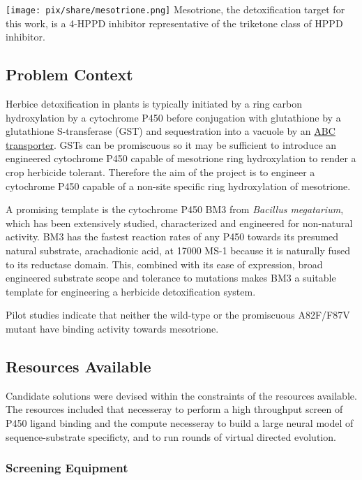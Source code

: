 \textbar\textbar\textbar{} \textbar\textbar\textbar{}
\textbar{}\texttt{[image: pix/share/mesotrione.png]}
\textbar Mesotrione, the detoxification target for this work, is a
4-HPPD inhibitor representative of the triketone class of HPPD
inhibitor.\textbar{}

\hypertarget{problem-context}{%
\subsection{Problem Context}\label{problem-context}}

Herbice detoxification in plants is typically initiated by a ring carbon
hydroxylation by a cytochrome P450 before conjugation with glutathione
by a glutathione S-transferase (GST) and sequestration into a vacuole by
an \href{really?}{ABC transporter}. GSTs can be promiscuous so it may be
sufficient to introduce an engineered cytochrome P450 capable of
mesotrione ring hydroxylation to render a crop herbicide tolerant.
Therefore the aim of the project is to engineer a cytochrome P450
capable of a non-site specific ring hydroxylation of mesotrione.

A promising template is the cytochrome P450 BM3 from \emph{Bacillus
megatarium}, which has been extensively studied, characterized and
engineered for non-natural activity. BM3 has the fastest reaction rates
of any P450 towards its presumed natural substrate, arachadionic acid,
at 17000 MS-1 because it is naturally fused to its reductase domain.
This, combined with its ease of expression, broad engineered substrate
scope and tolerance to mutations makes BM3 a suitable template for
engineering a herbicide detoxification system.

Pilot studies indicate that neither the wild-type or the promiscuous
A82F/F87V mutant have binding activity towards mesotrione.

\hypertarget{resources-available}{%
\subsection{Resources Available}\label{resources-available}}

Candidate solutions were devised within the constraints of the resources
available. The resources included that necesseray to perform a high
throughput screen of P450 ligand binding and the compute necesseray to
build a large neural model of sequence-substrate specificty, and to run
rounds of virtual directed evolution.

\hypertarget{screening-equipment}{%
\subsubsection{Screening Equipment}\label{screening-equipment}}

